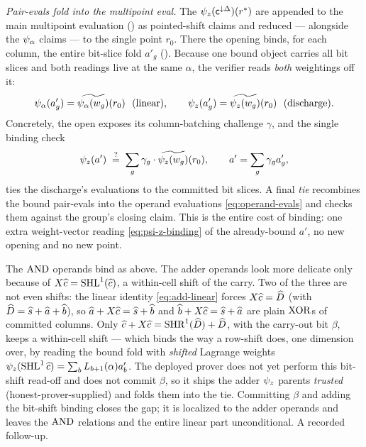 \emph{Pair-evals fold into the multipoint eval.} The
$\psi_{z}(\mathsf{c}^{\downarrow\Delta})(r^*)$ are appended to the main multipoint
evaluation () as pointed-shift claims and reduced ---
alongside the $\psi_{\alpha}$ claims --- to the single point $r_0$. There the opening
binds, for each column, the entire bit-slice fold $a'_g$
(). Because one bound object carries all bit slices and both
readings live at the same $\alpha$, the verifier reads \emph{both} weightings off
it:
\[
  \psia(a'_g) = \mle{\psia(w_g)}(r_0)\ \ (\text{linear}),
  \qquad
  \psiz(a'_g) = \mle{\psiz(w_g)}(r_0)\ \ (\text{discharge}).
\]
Concretely, the open exposes its column-batching challenge $\gamma$, and the
single binding check
\begin{equation}
  \label{eq:psi-z-binding}
  \psi_{z}(a') \;\stackrel{?}{=}\; \sum_{g} \gamma_g\cdot\widetilde{\psi_{z}(w_g)}(r_0),
  \qquad a' = \sum_g\gamma_g a'_g,
\end{equation}
ties the discharge's evaluations to the committed bit slices. A final \emph{tie}
recombines the bound pair-evals into the operand evaluations
\eqref{eq:operand-evals} and checks them against the group's closing claim. This
is the entire cost of binding: one extra weight-vector reading
\eqref{eq:psi-z-binding} of the already-bound $a'$, no new opening and no new
point.

\begin{remark}
\label{rem:adder-trusted}
The $\operatorname{AND}$ operands bind as above. The adder operands look more delicate only
because of $X\widehat{c} = \operatorname{SHL}^{1}(\widehat{c})$, a within-cell shift of the carry. Two of
the three are not even shifts: the linear identity \eqref{eq:add-linear} forces
$X\widehat{c} = \widehat{D}$ (with $\widehat{D} = \widehat{s}+\widehat{a}+\widehat{b}$), so
$\widehat{a}+X\widehat{c} = \widehat{s}+\widehat{b}$ and $\widehat{b}+X\widehat{c} = \widehat{s}+\widehat{a}$ are plain
$\operatorname{XOR}$s of committed columns. Only $\widehat{c}+X\widehat{c} = \operatorname{SHR}^{1}(\widehat{D})+\widehat{D}$,
with the carry-out bit $\beta$, keeps a within-cell shift --- which binds the way
a row-shift does, one dimension over, by reading the bound fold with
\emph{shifted} Lagrange weights $\psi_{z}(\operatorname{SHL}^{1}\widehat{c}) = \sum_b L_{b+1}(\alpha)a'_b$.
The deployed prover does not yet perform this bit-shift read-off and does not
commit $\beta$, so it ships the adder $\psi_{z}$ parents \emph{trusted}
(honest-prover-supplied) and folds them into the tie. Committing $\beta$ and
adding the bit-shift binding closes the gap; it is localized to the adder
operands and leaves the $\operatorname{AND}$ relations and the entire linear part
unconditional. A recorded follow-up.
\end{remark}

